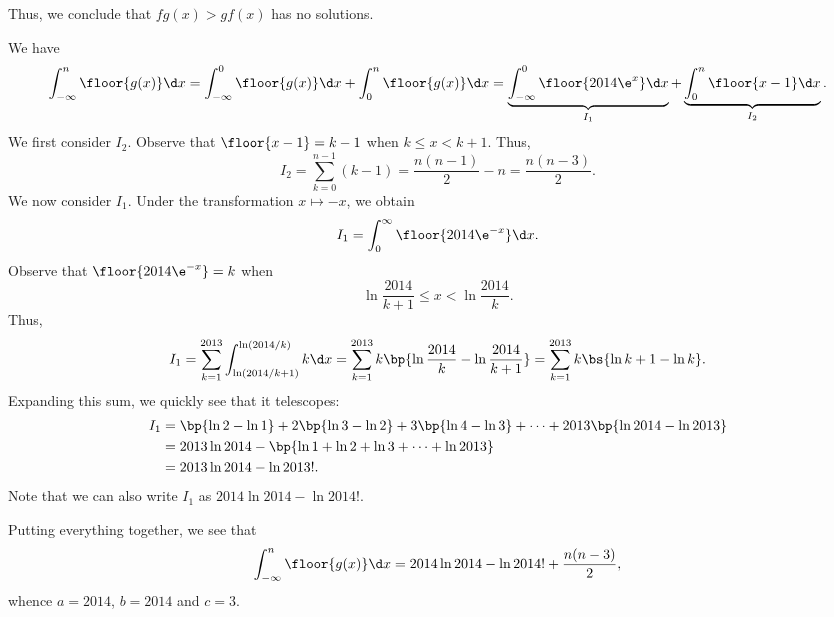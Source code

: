 \begin{solution}
\begin{ppart}
        Thus, we conclude that $fg(x) > gf(x)$ has no solutions.
    \end{ppart}
    \begin{ppart}
        We have \[\int_{-\infty}^n \floor{g(x)} \d x = \int_{-\infty}^0 \floor{g(x)} \d x + \int_{0}^n \floor{g(x)} \d x = \underbrace{\int_{-\infty}^0 \floor{2014 \e^x} \d x}_{I_1} + \underbrace{\int_0^n \floor{x-1} \d x}_{I_2}.\] We first consider $I_2$. Observe that $\floor{x-1} = k-1$ when $k \leq x < k+1$. Thus, \[I_2 = \sum_{k = 0}^{n-1} (k-1) = \frac{n(n-1)}{2} - n = \frac{n(n-3)}{2}.\] We now consider $I_1$. Under the transformation $x \mapsto -x$, we obtain \[I_1 = \int_0^\infty \floor{2014\e^{-x}}\d x.\] Observe that $\floor{2014\e^{-x}} = k$ when \[\ln \frac{2014}{k+1} \leq x < \ln \frac{2014}{k}.\] Thus, \[I_1 = \sum_{k=1}^{2013} \int_{\ln(2014/k+1)}^{\ln(2014/k)} k \d x = \sum_{k=1}^{2013} k \bp{\ln \frac{2014}{k} - \ln \frac{2014}{k+1}} = \sum_{k=1}^{2013} k \bs{\ln{k+1} - \ln k}.\] Expanding this sum, we quickly see that it telescopes:
        \begin{align*}
            I_1 &= \bp{\ln 2 - \ln 1} + 2\bp{\ln 3 - \ln 2} + 3 \bp{\ln 4 - \ln 3} + \dots + 2013 \bp{\ln 2014 - \ln 2013}\\
            &= 2013 \ln 2014 -\bp{\ln 1 + \ln 2 + \ln 3 + \dots + \ln 2013}\\
            &= 2013 \ln 2014 - \ln 2013!.
        \end{align*}
        Note that we can also write $I_1$ as $2014 \ln 2014 - \ln 2014!$. 
        
        Putting everything together, we see that \[\int_{-\infty}^n \floor{g(x)} \d x = 2014 \ln 2014 - \ln 2014! + \frac{n(n-3)}{2},\] whence $a = 2014$, $b = 2014$ and $c = 3$.
    \end{ppart}
\end{solution}